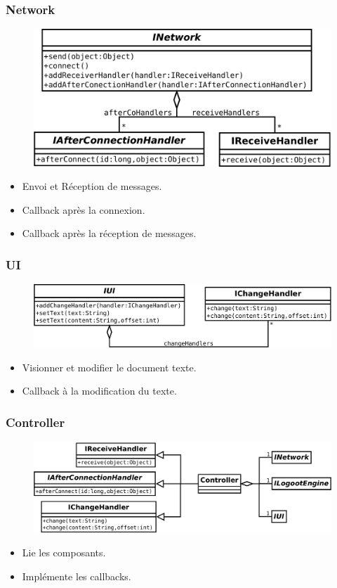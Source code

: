   \begin{frame}
    \frametitle{Network}
    \begin{figure}
    \center
		\includegraphics[scale=.3]{includes/model/INetwork.pdf}
    \end{figure}
    \begin{itemize}
      \item Envoi et Réception de messages.
      \item Callback après la connexion.
      \item Callback après la réception de messages.
    \end{itemize}
  \end{frame}

  \begin{frame}
    \frametitle{UI}
    \begin{figure}
    \center
		\includegraphics[scale=.3]{includes/model/IUI.pdf}
    \end{figure}
    \begin{itemize}
      \item Visionner et modifier le document texte.
      \item Callback à la modification du texte.
    \end{itemize}
  \end{frame}

  \begin{frame}
    \frametitle{Controller}
    \begin{figure}
    \center
		\includegraphics[scale=.3]{includes/model/Controller.pdf}
    \end{figure}
    \begin{itemize}
      \item Lie les composants.
      \item Implémente les callbacks.
    \end{itemize}
  \end{frame}

